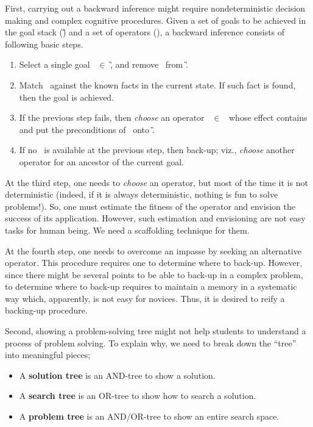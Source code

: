 First, carrying out a backward inference might require nondeterministic
decision making and complex cognitive procedures.  Given a set of goals
to be achieved in the goal stack (\G) and a set of operators (\OP), a
backward inference consists of following basic steps.

\begin{enumerate}
 \item Select a single goal \g\ $\in$ \G, and remove \g\ from \G.
 \item Match \g\ against the known facts in the current state.  If such
       fact is found, then the goal is achieved. 
 \item If the previous step fails, then \textit{choose} an operator \op\
       $\in$ \OP\ whose effect contains \g\, and put the preconditions of
       \op\ onto \G.
 \item If no \op\ is available at the previous step, then back-up; viz.,
       \textit{choose} another operator for an ancestor of the current
       goal.  
\end{enumerate}

At the third step, one needs to \textit{choose} an operator, but most of
the time it is not deterministic (indeed, if it is always deterministic,
nothing is fun to solve problems!).  So, one must estimate the fitness
of the operator and envision the success of its application.  However,
such estimation and envisioning are not easy tasks for human being.  We
need a scaffolding technique for them.  

At the fourth step, one needs to overcome an impasse by seeking an
alternative operator.  This procedure requires one to determine where to
back-up.  However, since there might be several points to be able to
back-up in a complex problem, to determine where to back-up requires to
maintain a memory in a systematic way which, apparently, is not easy for
novices.  Thus, it is desired to reify a backing-up procedure.

Second, showing a problem-solving tree might not help students to
understand a process of problem solving.  To explain why, we need to
break down the ``tree'' into meaningful pieces;

\begin{itemize}
 \item A \textbf{solution tree} is an AND-tree to show a solution.
 \item A \textbf{search tree} is an OR-tree to show how to search a
       solution.
 \item A \textbf{problem tree} is an AND/OR-tree to show an entire
       search space.
\end{itemize}


